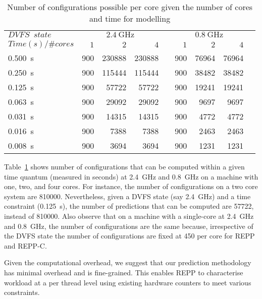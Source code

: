 \begin{table}[t]
\centering
    \caption[Time complexity in predictions]{ Number of configurations possible per core given the number of cores and time for modelling}
\begin{tabular}{@{}lrrrcrrrc@{}}\toprule
 $DVFS\enspace state$   & \multicolumn{3}{c}{$\SI{2.4}{\giga\hertz}$} & \phantom{abc}& \multicolumn{3}{c}{$\SI{0.8}{\giga\hertz}$} \\
\cmidrule{2-4} \cmidrule{6-8} 
    $Time(s)/\#cores $ & $1$ & $2$ & $4$ && $1$ & $2$ & $4$\\
\midrule
            \SI{0.500}{\second}   &900&230888&230888 &&900&76964&76964 \\ 
            \SI{0.250}{\second}   &900&115444&115444 &&900&38482&38482 \\ 
            \SI{0.125}{\second}   &900&57722&57722   &&900&19241&19241 \\ 
            \SI{0.063}{\second}   &900&29092&29092   &&900&9697&9697 \\ 
            \SI{0.031}{\second}   &900&14315&14315   &&900&4772&4772 \\ 
            \SI{0.016}{\second}   &900&7388&7388     &&900&2463&2463 \\ 
            \SI{0.008}{\second}   &900&3694&3694     &&900&1231&1231 \\ 

\bottomrule
\end{tabular}

\label{tab: coretime}
\end{table}

Table~\ref{tab: coretime} shows number of configurations that can be computed within a
given time quantum (measured in seconds) at \SI{2.4}{\giga\hertz} and
\SI{0.8}{\giga\hertz} on a machine with one, two, and four cores. For instance, the number
of configurations on a two core system are 810000. Nevertheless, given a DVFS state (say
\SI{2.4}{\giga\hertz}) and a time constraint (\SI{0.125}{\second}), the number of
predictions that can be computed are 57722, instead of 810000. Also observe that on a
machine with a single-core at \SI{2.4}{\giga\hertz} and \SI{0.8}{\giga\hertz}, the number
of configurations are the same because, irrespective of the DVFS state the number of
configurations are fixed at 450 per core for REPP and REPP-C.

Given the computational overhead, we suggest that our prediction methodology has minimal
overhead and is fine-grained. This enables REPP to characterise workload at a per thread
level using existing hardware counters to meet various constraints.
\newpage
